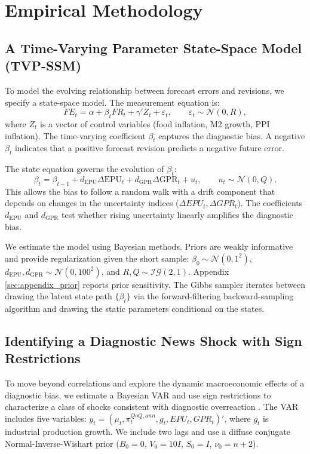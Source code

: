 \documentclass[12pt]{article}
\begin{document}


\section{Empirical Methodology}\label{sec:methods}
\subsection{A Time-Varying Parameter State-Space Model (TVP-SSM)}
To model the evolving relationship between forecast errors and revisions, we specify a state-space model. The measurement equation is:
\begin{equation}\label{eq:measurement}
    FE_t = \alpha + \beta_t FR_t + \gamma' Z_t + \varepsilon_t, \qquad \varepsilon_t \sim \mathcal{N}(0, R),
\end{equation}
where $Z_t$ is a vector of control variables (food inflation, M2 growth, PPI inflation). The time-varying coefficient $\beta_t$ captures the diagnostic bias. A negative $\beta_t$ indicates that a positive forecast revision predicts a negative future error.

The state equation governs the evolution of $\beta_t$:
\begin{equation}\label{eq:state}
    \beta_t = \beta_{t-1} + d_{\text{EPU}} \Delta \text{EPU}_t + d_{\text{GPR}} \Delta \text{GPR}_t + u_t, \qquad u_t \sim \mathcal{N}(0, Q).
\end{equation}
This allows the bias to follow a random walk with a drift component that depends on changes in the uncertainty indices ($\Delta EPU_t, \Delta GPR_t$). The coefficients $d_{\text{EPU}}$ and $d_{\text{GPR}}$ test whether rising uncertainty linearly amplifies the diagnostic bias.

We estimate the model using Bayesian methods. Priors are weakly informative and provide regularization given the short sample: $\beta_0 \sim \mathcal{N}(0, 1^2)$, $d_{\text{EPU}}, d_{\text{GPR}} \sim \mathcal{N}(0, 100^2)$, and $R, Q \sim \mathcal{IG}(2, 1)$. Appendix \ref{sec:appendix_prior} reports prior sensitivity. The Gibbs sampler iterates between drawing the latent state path $\{\beta_t\}$ via the forward-filtering backward-sampling algorithm and drawing the static parameters conditional on the states.

\subsection{Identifying a Diagnostic News Shock with Sign Restrictions}
To move beyond correlations and explore the dynamic macroeconomic effects of a diagnostic bias, we estimate a Bayesian VAR and use sign restrictions to characterize a class of shocks consistent with diagnostic overreaction \cite{Uhlig2005}. The VAR includes five variables: $y_t = (\mu_t, \pi^{QoQ,ann}_t, g_t, EPU_t, GPR_t)'$, where $g_t$ is industrial production growth. We include two lags and use a diffuse conjugate Normal-Inverse-Wishart prior ($B_0=0$, $V_0=10I$, $S_0=I$, $\nu_0=n+2$).
\end{document}
